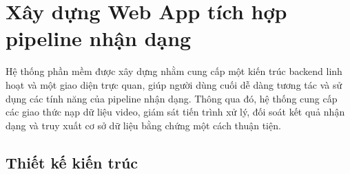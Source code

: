 \documentclass[../DoAn.tex]{subfiles}
\begin{document}


\section{Xây dựng Web App tích hợp pipeline nhận dạng}
\label{section:4.3}

Hệ thống phần mềm được xây dựng nhằm cung cấp một kiến trúc backend linh hoạt và một giao diện trực quan, giúp người dùng cuối dễ dàng tương tác và sử dụng các tính năng của pipeline nhận dạng. Thông qua đó, hệ thống cung cấp các giao thức nạp dữ liệu video, giám sát tiến trình xử lý, đối soát kết quả nhận dạng và truy xuất cơ sở dữ liệu bằng chứng một cách thuận tiện.

\subsection{Thiết kế kiến trúc}
\label{subsection:4.3.1}
\end{document}
